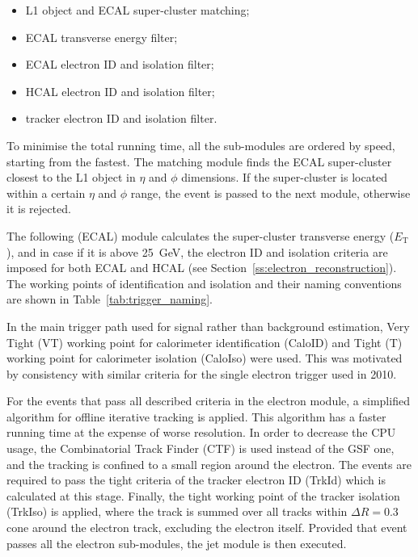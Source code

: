 \begin{itemize}
  \item L1 object and ECAL super-cluster matching;
  \item ECAL transverse energy filter;
  \item ECAL electron ID and isolation filter;
  \item HCAL electron ID and isolation filter;
  \item tracker electron ID and isolation filter.
\end{itemize}

To minimise the total running time, all the sub-modules are ordered by speed, starting from the fastest. The matching
module finds the ECAL super-cluster closest to the L1 object in $\eta$ and $\phi$ dimensions. If the super-cluster is
located within a certain $\eta$ and $\phi$ range, the event is passed to the next module, otherwise it is rejected.

The following (ECAL) module calculates the super-cluster transverse energy ($E_\mathrm{T}$), and in case if it is above
\SI{25}{\GeV}, the electron ID and isolation criteria are imposed for both ECAL and HCAL (see
Section~\ref{ss:electron_reconstruction}). The working points of identification and isolation and their naming
conventions are shown in Table~\ref{tab:trigger_naming}.



In the main trigger path used for signal rather than background estimation, Very Tight (VT) working point for
calorimeter identification (CaloID) and Tight (T) working point for calorimeter isolation (CaloIso) were used. This was
motivated by consistency with similar criteria for the single electron trigger used in 2010.

For the events that pass all described criteria in the electron module, a simplified algorithm for offline iterative
tracking is applied. This algorithm has a faster running time at the expense of worse resolution. In order to decrease
the CPU usage, the Combinatorial Track Finder (CTF) \cite{CTF_tracking} is used instead of the GSF one, and the tracking
is confined to a small region around the electron. The events are required to pass the tight criteria of the tracker
electron ID (TrkId) which is calculated at this stage. Finally, the tight working point of the tracker isolation
(TrkIso) is applied, where the track \pt is summed over all tracks within $\Delta R = 0.3$ cone around the electron
track, excluding the electron itself. Provided that event passes all the electron sub-modules, the jet module is then
executed.

